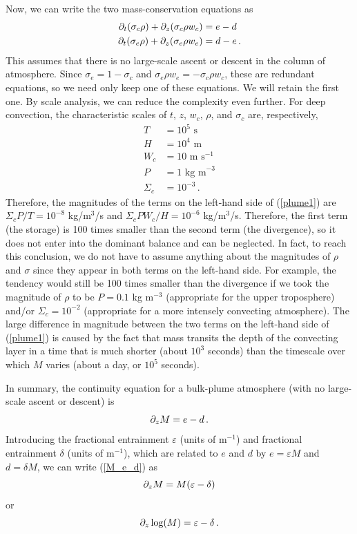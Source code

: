 \documentclass[12pt]{article}
\begin{document}
Now, we can write the two mass-conservation equations as
\begin{align}
\partial_t (\sigma_c \rho) + \partial_z (\sigma_c \rho w_c) &= e - d \label{plume1} \\
\partial_t (\sigma_e \rho) + \partial_z (\sigma_e \rho w_e) &= d - e \, .
\end{align}
This assumes that there is no large-scale ascent or descent in the column of atmosphere.  Since $\sigma_e = 1 - \sigma_c$ and $\sigma_e\rho w_e = -\sigma_c \rho w_c$, these are redundant equations, so we need only keep one of these equations.  We will retain the first one.  By scale analysis, we can reduce the complexity even further.  For deep convection, the characteristic scales of $t$, $z$, $w_c$, $\rho$, and $\sigma_c$ are, respectively,
\begin{align}
T &= 10^5 \text{ s} \\
H &= 10^4 \text{ m} \\ 
W_c &= 10 \text{ m s}^{-1} \\
P &= 1 \text{ kg m}^{-3} \\
\Sigma_c &= 10^{-3} \, .
\end{align}
Therefore, the magnitudes of the terms on the left-hand side of (\ref{plume1}) are $\Sigma_c P / T = 10^{-8}$ kg/m$^3$/s and $\Sigma_c P W_c/H = 10^{-6}$ kg/m$^3$/s.  Therefore, the first term (the storage) is 100 times smaller than the second term (the divergence), so it does not enter into the dominant balance and can be neglected.  In fact, to reach this conclusion, we do not have to assume anything about the magnitudes of $\rho$ and $\sigma$ since they appear in both terms on the left-hand side.  For example, the tendency would still be 100 times smaller than the divergence if we took the magnitude of $\rho$ to be $P = 0.1$ kg m$^{-3}$ (appropriate for the upper troposphere) and/or $\Sigma_c = 10^{-2}$ (appropriate for a more intensely convecting atmosphere).  The large difference in magnitude between the two terms on the left-hand side of (\ref{plume1}) is caused by the fact that mass transits the depth of the convecting layer in a time that is much shorter (about $10^3$ seconds) than the timescale over which $M$ varies (about a day, or $10^5$ seconds).


In summary, the continuity equation for a bulk-plume atmosphere (with no large-scale ascent or descent) is
\begin{equation}
\partial_z M = e - d \, . \label{M_e_d}
\end{equation}
Introducing the fractional entrainment $\varepsilon$ (units of m$^{-1}$) and fractional entrainment $\delta$ (units of m$^{-1}$), which are related to $e$ and $d$ by $e = \varepsilon M$ and $d = \delta M$, we can write (\ref{M_e_d}) as 
\[
\partial_z M = M (\varepsilon - \delta) 
\]
or
\[
\partial_z \log(M) = \varepsilon - \delta \, .
\]
\end{document}
